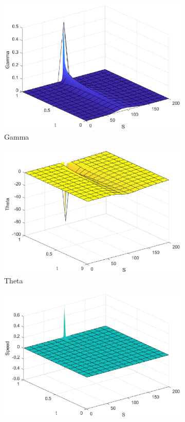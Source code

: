 \begin{figure}[H]
\begin{subfigure}[b]{0.35\linewidth}
        \includegraphics[width=\linewidth]{Imagenes/6_Sols/Call/Call_Gamma.eps}
        \caption{Gamma}
    \end{subfigure}
    \begin{subfigure}[b]{0.35\linewidth}
        \includegraphics[width=\linewidth]{Imagenes/6_Sols/Call/Call_Theta.eps}
        \caption{Theta}
    \end{subfigure}
    \begin{subfigure}[b]{0.35\linewidth}
        \includegraphics[width=\linewidth]{Imagenes/6_Sols/Call/Call_Speed.eps}

\end{subfigure}
\end{figure}
